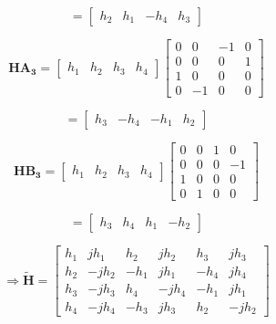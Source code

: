 \documentclass[fleqn]{article}
\begin{document}
\begin{enumerate}
\begin{enumerate}
			\begin{equation*}
				= \begin{bmatrix}
					h_2 & h_1 & -h_4 & h_3
				\end{bmatrix}
			\end{equation*}
			
			\begin{equation*}
				\mathbf{HA_3} = \begin{bmatrix}
					h_1 & h_2 & h_3 & h_4
				\end{bmatrix}\begin{bmatrix}
					0 &  0 & -1 & 0 \\
					0 &  0 &  0 & 1 \\
					1 &  0 &  0 & 0 \\
					0 & -1 &  0 & 0
				\end{bmatrix}
			\end{equation*}
			
			\begin{equation*}
				= \begin{bmatrix}
					h_3 & -h_4 & -h_1 & h_2
				\end{bmatrix}
			\end{equation*}
			
			\begin{equation*}
				\mathbf{HB_3} = \begin{bmatrix}
					h_1 & h_2 & h_3 & h_4
				\end{bmatrix}\begin{bmatrix}
					0 & 0 & 1 &  0 \\
					0 & 0 & 0 & -1 \\
					1 & 0 & 0 &  0 \\
					0 & 1 & 0 &  0
				\end{bmatrix}
			\end{equation*}
			
			\begin{equation*}
				= \begin{bmatrix}
					h_3 & h_4 & h_1 & -h_2
				\end{bmatrix}
			\end{equation*}
			
			\begin{equation*}
				\Rightarrow \mathbf{\tilde{H}} = \begin{bmatrix}
					h_1 &  jh_1 &  h_2 &  jh_2 &  h_3 &  jh_3 \\
					h_2 & -jh_2 & -h_1 &  jh_1 & -h_4 &  jh_4 \\
					h_3 & -jh_3 &  h_4 & -jh_4 & -h_1 &  jh_1 \\
					h_4 & -jh_4 & -h_3 &  jh_3 &  h_2 & -jh_2
				\end{bmatrix}
			\end{equation*}
			

\end{enumerate}
\end{enumerate}
\end{document}

